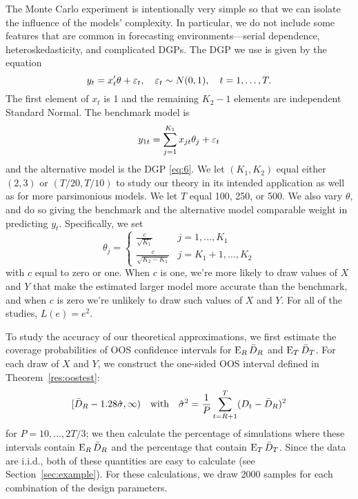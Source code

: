 \documentclass[12pt]{article}
\begin{document}
The Monte Carlo experiment is intentionally very simple so that we can
isolate the influence of the models' complexity.  In particular, we do
not include some features that are common in forecasting
environments---serial dependence, heteroskedasticity, and complicated
DGPs. The DGP we use is given by the equation
\begin{equation}\label{eq:6}
  y_t = x_t'\theta + \varepsilon_t,\quad \varepsilon_t \sim N(0,1),
  \quad t=1,\dots,T.
\end{equation}
The first element of $x_t$ is 1 and the remaining $K_2-1$ elements are
independent Standard Normal.  The benchmark model is
\begin{equation}
  \label{eq:1}
  y_{1t} = \sum_{j=1}^{K_1} x_{jt}\theta_j + \varepsilon_t
\end{equation}
and the alternative model is the DGP \eqref{eq:6}.  We let
$(K_1,K_2)$ equal either $(2,3)$ or $(T/20,T/10)$ to study our theory
in its intended application as well as for more parsimonious models.
We let $T$ equal 100, 250, or 500.  We also vary $\theta$, and do
so giving the benchmark and the alternative model comparable weight in
predicting $y_t$.  Specifically, we set
\begin{equation*}
  \theta_j =
\begin{cases} \frac{c}{\sqrt{K_1}} & j = 1,\dots,K_1 \\
\frac{c}{\sqrt{K_2 - K_1}} & j = K_1 + 1,\dots,K_2 \end{cases}
\end{equation*}
with $c$ equal to zero or one.  When $c$ is one, we're more likely to
draw values of $X$ and $Y$ that make the estimated larger model more
accurate than the benchmark, and when $c$ is zero we're unlikely to
draw such values of $X$ and $Y$.  For all of the studies, $L(e) =
e^2$.

To study the accuracy of our theoretical approximations, we first
estimate the coverage probabilities of OOS confidence intervals for
$\operatorname{E}_R \bar{D}_{R}$ and $\operatorname{E}_T \bar{D}_{T}$. For each draw of $X$ and $Y$, we
construct the one-sided OOS interval defined in
Theorem~\ref{res:oostest}:
\begin{equation*}
  [ \bar{D}_{R} - 1.28 \hat{\sigma}, \infty) \quad\text{with}\quad
  \hat{\sigma}^2 = \frac1P \sum_{t=R+1}^T (D_t - \bar{D}_{R})^{2}
\end{equation*}
for $P = 10,\dots,2T/3$; we then calculate the percentage of
simulations where these intervals contain $\operatorname{E}_R \bar{D}_{R}$ and the
percentage that contain $\operatorname{E}_T \bar{D}_{T}$.  Since the data are i.i.d., both
of these quantities are easy to calculate (see
Section~\ref{sec:example}). For these calculations, we draw 2000
samples for each combination of the design parameters.
\end{document}
